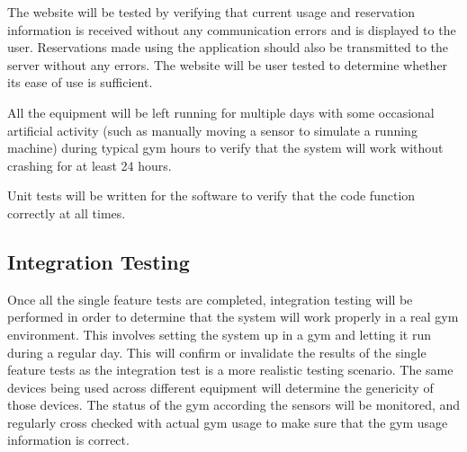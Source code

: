 \documentclass[PPFS.tex]{template/subfiles}
\begin{document}
The website will be tested by verifying that current usage and reservation information is received without any communication errors and is displayed to the user. Reservations made using the application should also be transmitted to the server without any errors. The website will be user tested to determine whether its ease of use is sufficient.

All the equipment will be left running for multiple days with some occasional artificial activity (such as manually moving a sensor to simulate a running machine) during typical gym hours to verify that the system will work without crashing for at least 24 hours.

Unit tests will be written for the software to verify that the code function correctly at all times.

\subsection{Integration Testing}

Once all the single feature tests are completed, integration testing will be performed in order to determine that the system will work properly in a real gym environment. This involves setting the system up in a gym and letting it run during a regular day. This will confirm or invalidate the results of the single feature tests as the integration test is a more realistic testing scenario. The same devices being used across different equipment will determine the genericity of those devices. The status of the gym according the sensors will be monitored, and regularly cross checked with actual gym usage to make sure that the gym usage information is correct. 
\end{document}
